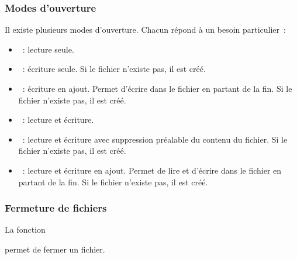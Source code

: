 \begin{frame} \frametitle{Modes d'ouverture}
Il existe plusieurs \alert{modes d'ouverture}. Chacun répond à un besoin
particulier~:
\smallskip

\begin{itemize}
    \item {}~: lecture seule.
    \medskip

    \item {}~: écriture seule. Si le fichier n'existe pas, il
    est créé.
    \medskip

    \item {}~: écriture en ajout. Permet d'écrire dans le fichier
    en partant de la fin. Si le fichier n'existe pas, il est créé.
    \medskip

    \item {}~: lecture et écriture.
    \medskip

    \item {}~: lecture et écriture avec suppression préalable
    du contenu du fichier. Si le fichier n'existe pas, il est créé.
    \medskip

    \item {}~: lecture et écriture en ajout. Permet de lire et
    d'écrire dans le fichier en partant de la fin. Si le fichier
    n'existe pas, il est créé.
\end{itemize}
\end{frame}

\begin{frame} \frametitle{Fermeture de fichiers}
La fonction
\begin{center}
\end{center}
permet de \alert{fermer un fichier}.
\bigskip



\end{frame}

